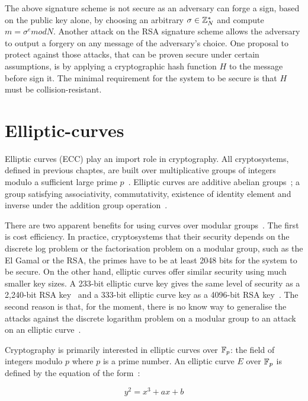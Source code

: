 The above signature scheme is not secure as an adversary can forge a sign, based on the public key alone, by choosing an arbitrary $\sigma \in \mathbb{Z}^{*}_{N}$ and compute $m = \sigma^{e}modN$. Another attack on the RSA signature scheme allows the adversary to output a forgery on any message of the adversary's choice. One proposal to protect against those attacks, that can be proven secure under certain assumptions, is by applying a cryptographic hash function $H$ to the message before sign it. The minimal requirement for the system to be secure is that $H$ must be collision-resistant.

\section{Elliptic-curves}
\label{preliminaries:el_curves}

Elliptic curves (ECC) play an import role in cryptography. All cryptosystems, defined in previous chaptes, are built over multiplicative groups of integers modulo a sufficient large prime $p$~\cite{kiagias:crypto, boneh_crypto}. Elliptic curves are additive abelian groups~\cite{kiagias:crypto}; a group satisfying associativity, commutativity, existence of identity element and inverse under the addition group operation~\cite{elliptic_curves_2}.

There are two apparent benefits for using curves over modular groups~\cite{kiagias:crypto}. The first is cost efficiency. In practice, cryptosystems that their security depends on the discrete log problem or the factorisation problem on a modular group, such as the El Gamal or the RSA, the primes have to be at least 2048 bits for the system to be secure. On the other hand, elliptic curves offer similar security using much smaller key sizes. A 233-bit elliptic curve key gives the same level of security as a 2,240-bit RSA key~\cite{ecc_rsa_bits, ecc_rsa_bits_1} and a 333-bit elliptic curve key as a 4096-bit RSA key~\cite{blake1999elliptic}. The second reason is that, for the moment, there is no know way to generalise the attacks against the discrete logarithm problem on a modular group to an attack on an elliptic curve~\cite{kiagias:crypto}.

Cryptography is primarily interested in elliptic curves over $\mathbb{F}_p$: the field of integers modulo $p$ where $p$ is a prime number. An elliptic curve $E$ over $\mathbb{F}_p$ is defined by the equation of the form~\cite{elliptic_curves, elliptic_curves_2}:

\begin{equation*}
  y^2 = x^3 + ax + b
\end{equation*}

